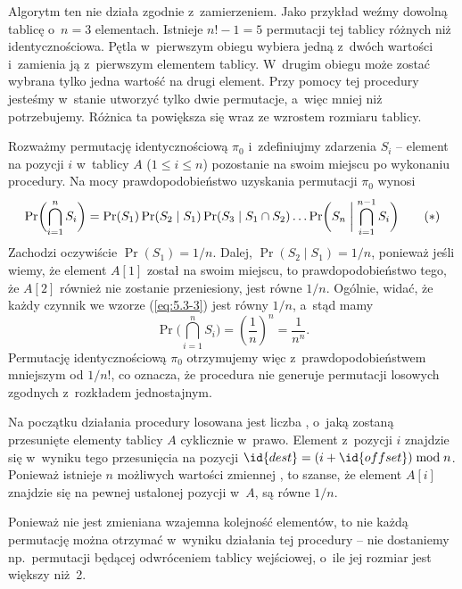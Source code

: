 \exercise %

\noindent Algorytm ten nie działa zgodnie z~zamierzeniem. Jako przykład weźmy dowolną tablicę o~$n=3$ elementach. Istnieje $n!-1=5$ permutacji tej tablicy różnych niż identycznościowa. Pętla  w~pierwszym obiegu wybiera jedną z~dwóch wartości i~zamienia ją z~pierwszym elementem tablicy. W~drugim obiegu może zostać wybrana tylko jedna wartość na drugi element. Przy pomocy tej procedury jesteśmy w~stanie utworzyć tylko dwie permutacje, a~więc mniej niż potrzebujemy. Różnica ta powiększa się wraz ze wzrostem rozmiaru tablicy.

\exercise %
Rozważmy permutację identycznościową $\pi_0$ i~zdefiniujmy zdarzenia $S_i$ -- element na pozycji $i$ w~tablicy $A$ ($1\le i\le n$) pozostanie na swoim miejscu po wykonaniu procedury. Na mocy  prawdopodobieństwo uzyskania permutacji $\pi_0$ wynosi
\[
	\Pr\biggl(\bigcap_{i=1}^nS_i\biggr) = \Pr(S_1)\Pr(S_2\mid S_1)\Pr(S_3\mid S_1\cap S_2)\dots\Pr\biggl(S_n\biggm|\bigcap_{i=1}^{n-1}S_i\biggr) \tag{$*$}\label{eq:5.3-3}
\]
Zachodzi oczywiście $\Pr(S_1)=1/n$. Dalej, $\Pr(S_2\mid S_1)=1/n$, ponieważ jeśli wiemy, że element $A[1]$ został na swoim miejscu, to prawdopodobieństwo tego, że $A[2]$ również nie zostanie przeniesiony, jest równe $1/n$. Ogólnie, widać, że każdy czynnik we wzorze (\ref{eq:5.3-3}) jest równy $1/n$, a~stąd mamy
\[
	\Pr\biggl(\bigcap_{i=1}^nS_i\biggr) = \left(\frac{1}{n}\right)^n = \frac{1}{n^n}.
\]
Permutację identycznościową $\pi_0$ otrzymujemy więc z~prawdopodobieństwem mniejszym od $1/n!$, co oznacza, że procedura  nie generuje permutacji losowych zgodnych z~rozkładem jednostajnym.

\exercise %
Na początku działania procedury losowana jest liczba , o~jaką zostaną przesunięte elementy tablicy $A$ cyklicznie w~prawo. Element z~pozycji $i$ znajdzie się w~wyniku tego przesunięcia na pozycji $\id{dest}=(i+\id{offset})\bmod n$. Ponieważ istnieje $n$ możliwych wartości zmiennej , to szanse, że element $A[i]$ znajdzie się na pewnej ustalonej pozycji w~$A$, są równe $1/n$.

Ponieważ nie jest zmieniana wzajemna kolejność elementów, to nie każdą permutację można otrzymać w~wyniku działania tej procedury -- nie dostaniemy np.\ permutacji będącej odwróceniem tablicy wejściowej, o~ile jej rozmiar jest większy niż~2.

